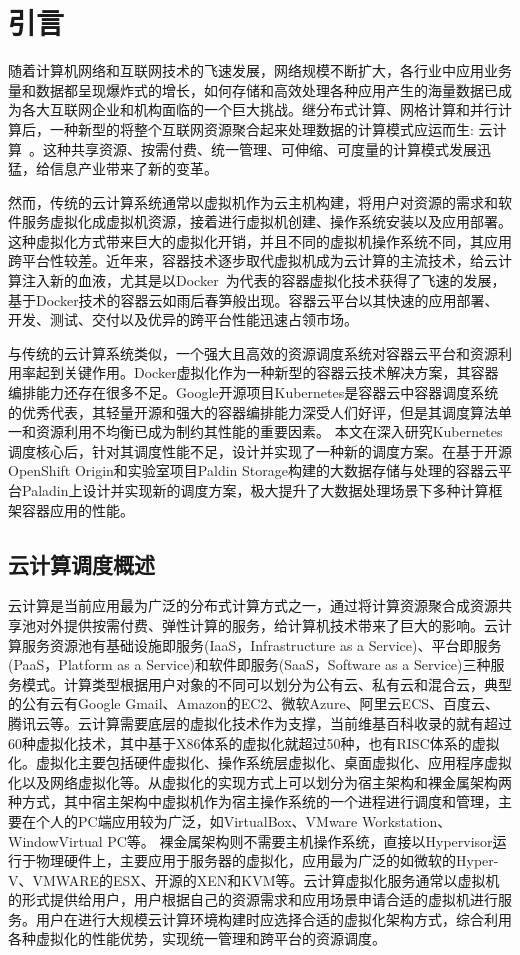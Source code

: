 \chapter{引言}
随着计算机网络和互联网技术的飞速发展，网络规模不断扩大，各行业中应用业务量和数据都呈现爆炸式的增长，如何存储和高效处理各种应用产生的海量数据已成为各大互联网企业和机构面临的一个巨大挑战。继分布式计算、网格计算和并行计算后，一种新型的将整个互联网资源聚合起来处理数据的计算模式应运而生: 云计算~\cite{Hayes2008Cloud}。这种共享资源、按需付费、统一管理、可伸缩、可度量的计算模式发展迅猛，给信息产业带来了新的变革。

然而，传统的云计算系统通常以虚拟机作为云主机构建，将用户对资源的需求和软件服务虚拟化成虚拟机资源，接着进行虚拟机创建、操作系统安装以及应用部署。这种虚拟化方式带来巨大的虚拟化开销，并且不同的虚拟机操作系统不同，其应用跨平台性较差。近年来，容器技术逐步取代虚拟机成为云计算的主流技术，给云计算注入新的血液，尤其是以Docker~\cite{2015Docker}为代表的容器虚拟化技术获得了飞速的发展，基于Docker技术的容器云如雨后春笋般出现。容器云平台以其快速的应用部署、开发、测试、交付以及优异的跨平台性能迅速占领市场。

与传统的云计算系统类似，一个强大且高效的资源调度系统对容器云平台和资源利用率起到关键作用。Docker虚拟化作为一种新型的容器云技术解决方案，其容器编排能力还存在很多不足。Google开源项目Kubernetes是容器云中容器调度系统的优秀代表，其轻量开源和强大的容器编排能力深受人们好评，但是其调度算法单一和资源利用不均衡已成为制约其性能的重要因素。
本文在深入研究Kubernetes调度核心后，针对其调度性能不足，设计并实现了一种新的调度方案。在基于开源OpenShift Origin和实验室项目Paldin Storage构建的大数据存储与处理的容器云平台Paladin上设计并实现新的调度方案，极大提升了大数据处理场景下多种计算框架容器应用的性能。

\section{云计算调度概述}
云计算是当前应用最为广泛的分布式计算方式之一，通过将计算资源聚合成资源共享池对外提供按需付费、弹性计算的服务，给计算机技术带来了巨大的影响。云计算服务资源池有基础设施即服务(IaaS，Infrastructure as a Service)、平台即服务(PaaS，Platform as a Service)和软件即服务(SaaS，Software as a Service)三种服务模式。计算类型根据用户对象的不同可以划分为公有云、私有云和混合云，典型的公有云有Google Gmail、Amazon的EC2、微软Azure、阿里云ECS、百度云、腾讯云等。云计算需要底层的虚拟化技术作为支撑，当前维基百科收录的就有超过60种虚拟化技术，其中基于X86体系的虚拟化就超过50种，也有RISC体系的虚拟化。虚拟化主要包括硬件虚拟化、操作系统层虚拟化、桌面虚拟化、应用程序虚拟化以及网络虚拟化等。从虚拟化的实现方式上可以划分为宿主架构和裸金属架构两种方式，其中宿主架构中虚拟机作为宿主操作系统的一个进程进行调度和管理，主要在个人的PC端应用较为广泛，如VirtualBox、VMware Workstation、WindowVirtual PC等。
裸金属架构则不需要主机操作系统，直接以Hypervisor运行于物理硬件上，主要应用于服务器的虚拟化，应用最为广泛的如微软的Hyper-V、VMWARE的ESX、开源的XEN和KVM等。云计算虚拟化服务通常以虚拟机的形式提供给用户，用户根据自己的资源需求和应用场景申请合适的虚拟机进行服务。用户在进行大规模云计算环境构建时应选择合适的虚拟化架构方式，综合利用各种虚拟化的性能优势，实现统一管理和跨平台的资源调度。

